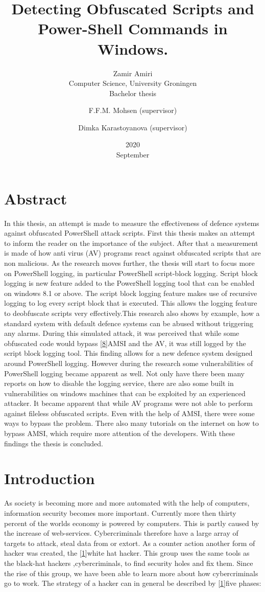 \documentclass{article}%
\title{Detecting Obfuscated Scripts and Power-Shell Commands in Windows.}
\date{2020\\ September}
\author{Zamir Amiri\\ Computer Science, University Groningen 
\\Bachelor thesis
\and F.F.M. Mohsen (supervisor)
\and Dimka Karastoyanova (supervisor)
}
\begin{document}
\maketitle
\section*{Abstract}
In this thesis, an attempt is made to measure the effectiveness of defence systems against obfuscated PowerShell attack scripts. First this thesis makes an attempt to inform the reader on the importance of the subject. After that a measurement is made of how anti virus (AV) programs react against obfuscated scripts that are non malicious. As the research moves further, the thesis will start to focus more on PowerShell logging, in particular PowerShell script-block logging. Script block logging is new feature added to the PowerShell logging tool that can be enabled on windows 8.1 or above. The script block logging feature makes use of recursive logging to log every script block that is executed. This allows the logging feature to deobfuscate scripts very effectively.This research also shows by example, how a standard system with default defence systems can be abused without triggering any alarms. During this simulated attack, it was perceived that while some obfuscated code would bypass [\hyperlink{8}{8}]AMSI and the AV, it was still logged by the script block logging tool. This finding allows for a new defence system designed around PowerShell logging. However during the research some vulnerabilities of PowerShell logging became apparent as well. Not only have there been many reports on how to disable the logging service, there are also some built in vulnerabilities on windows machines that can be exploited by an experienced attacker. It became apparent that while AV programs were not able to perform against fileless obfuscated scripts. Even with the help of AMSI, there were some ways to bypass the problem. There also many tutorials on the internet on how to bypass AMSI, which require more attention of the developers. With these findings the thesis is concluded.
\newpage
\tableofcontents
\newpage
\section{Introduction}
As society is becoming more and more automated with the help of computers, information security becomes more important. Currently more then thirty percent of the worlds economy is powered by computers. This is partly caused by the increase of web-services. Cybercriminals therefore have a large array of targets to attack, steal data from or extort. As a counter action another form of hacker was created, the [\hyperlink{1}{1}]white hat hacker. This group uses the same tools as the black-hat hackers ,cybercriminals, to find security holes and fix them. Since the rise of this group, we have been able to learn more about how cybercriminals go to work. The strategy of a hacker can in general be described by [\hyperlink{1}{1}]five phases:
\end{document}
